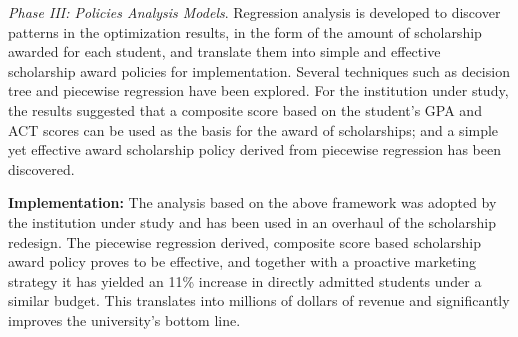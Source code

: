 \documentclass[12pt,english]{report}
\begin{document}
\vspace*{.1in} 
\noindent \textit{Phase III: Policies Analysis Models}. Regression analysis is developed to discover patterns in the optimization 
results, in the form of the  amount of scholarship awarded for each student, and translate them into simple and effective 
scholarship award policies for implementation. Several techniques such as decision tree and piecewise regression  have been 
explored. For the institution under study, the results suggested that  a composite score based on the student's GPA and ACT scores 
can be used as the basis for the award of scholarships; and a simple  yet effective award scholarship policy derived from piecewise 
regression has been discovered.


\vspace*{.15in}
\noindent \textbf{Implementation:} The analysis based on the above framework was adopted by the institution under study and has been 
used in an overhaul of the scholarship redesign. The piecewise regression derived, composite score based scholarship award policy 
proves to be effective, and together with a proactive marketing strategy it has yielded an 11\% increase in directly admitted 
students under a similar budget. This translates into millions of dollars of revenue and significantly improves the university's 
bottom line.

\newpage 

\end{document}
